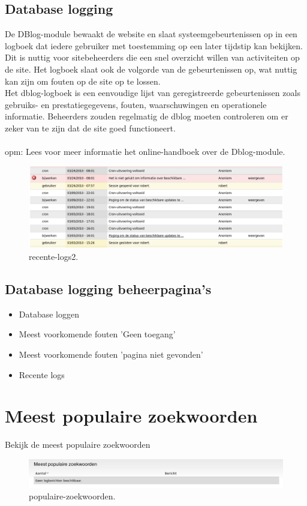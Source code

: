 \subsection{Database logging}
De DBlog-module bewaakt de website en slaat systeemgebeurtenissen op in een logboek dat iedere gebruiker
 met toestemming op een later tijdstip kan bekijken. Dit is nuttig voor sitebeheerders die een snel overzicht
willen van activiteiten op de site. Het logboek slaat ook de volgorde van de gebeurtenissen op, 
wat nuttig kan zijn om fouten op de site op te lossen.
\\
Het dblog-logboek is een eenvoudige lijst van geregistreerde gebeurtenissen zoals gebruiks- en prestatiegegevens, 
fouten, waarschuwingen en operationele informatie. Beheerders zouden regelmatig de dblog moeten controleren om er 
zeker van te zijn dat de site goed functioneert.
\\\\
opm: Lees voor meer informatie het online-handboek over de Dblog-module.
 \begin{figure}[!h]
    \centering
   \includegraphics[scale=0.4,angle=0]{recente-logs2}
   \caption{recente-logs2.\label{white}}
 \end{figure}
\subsection{Database logging beheerpagina's}
\begin{itemize}
 \item Database loggen
 \item Meest voorkomende fouten 'Geen toegang'
 \item Meest voorkomende fouten 'pagina niet gevonden'
 \item Recente logs
\end{itemize}

\section{Meest populaire zoekwoorden} 
    Bekijk de meest populaire zoekwoorden
\begin{figure}[!h]
    \centering
   \includegraphics[scale=0.4,angle=0]{populaire-zoekwoorden}
   \caption{populaire-zoekwoorden.\label{white}}
 \end{figure}    
    
